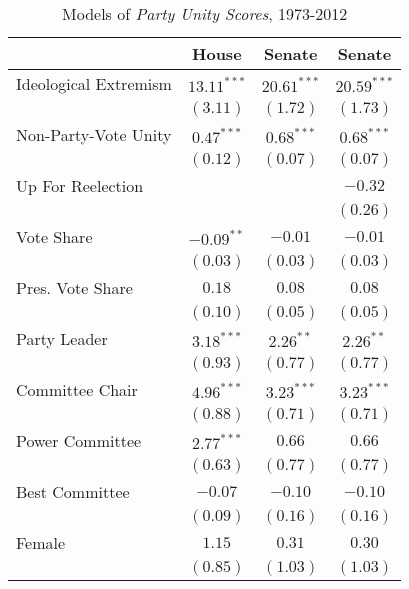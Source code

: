 \documentclass[12pt]{article}
\begin{document}
\begin{table}[!htbp]
\centering
\begin{threeparttable}
\caption{Models of \textit{Party Unity Scores}, 1973-2012}
\label{tab-party-unity-regressions}
\singlespacing
\begin{tabular}{l c c c }
\hline
& House & Senate & Senate \\
\hline
Ideological Extremism & $13.11^{***}$ & $20.61^{***}$ & $20.59^{***}$ \\
                      & $(3.11)$      & $(1.72)$      & $(1.73)$      \\
Non-Party-Vote Unity  & $0.47^{***}$  & $0.68^{***}$  & $0.68^{***}$  \\
                      & $(0.12)$      & $(0.07)$      & $(0.07)$      \\
Up For Reelection     &               &               & $-0.32$       \\
                      &               &               & $(0.26)$      \\
Vote Share            & $-0.09^{**}$  & $-0.01$       & $-0.01$       \\
                      & $(0.03)$      & $(0.03)$      & $(0.03)$      \\
Pres. Vote Share       & $0.18$        & $0.08$        & $0.08$        \\
                      & $(0.10)$      & $(0.05)$      & $(0.05)$      \\
Party Leader          & $3.18^{***}$  & $2.26^{**}$   & $2.26^{**}$   \\
                      & $(0.93)$      & $(0.77)$      & $(0.77)$      \\
Committee Chair       & $4.96^{***}$  & $3.23^{***}$  & $3.23^{***}$  \\
                      & $(0.88)$      & $(0.71)$      & $(0.71)$      \\
Power Committee       & $2.77^{***}$  & $0.66$        & $0.66$        \\
                      & $(0.63)$      & $(0.77)$      & $(0.77)$      \\
Best Committee        & $-0.07$       & $-0.10$       & $-0.10$       \\
                      & $(0.09)$      & $(0.16)$      & $(0.16)$      \\
Female                & $1.15$        & $0.31$        & $0.30$        \\
                      & $(0.85)$      & $(1.03)$      & $(1.03)$      \\

\end{tabular}
\end{threeparttable}
\end{table}
\end{document}
